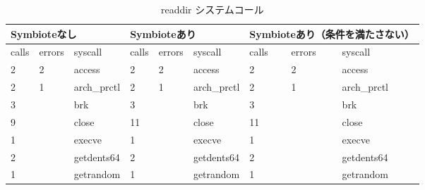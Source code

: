 \documentclass[submit,techreq,noauthor]{eco}	%
\begin{document}
\begin{table*}[t]
  \centering
  \caption{readdir システムコール}
  \label{table: readdir}
  \begin{tabular}{|lll|lll|lll|}
  \hline
  \multicolumn{3}{|l|}{Symbioteなし}                                              & \multicolumn{3}{l|}{Symbioteあり}                                              & \multicolumn{3}{l|}{Symbioteあり（条件を満たさない）}                                    \\ \hline
  \multicolumn{1}{|l|}{calls} & \multicolumn{1}{l|}{errors} & syscall           & \multicolumn{1}{l|}{calls} & \multicolumn{1}{l|}{errors} & syscall           & \multicolumn{1}{l|}{calls} & \multicolumn{1}{l|}{errors} & syscall           \\ \hline
  \multicolumn{1}{|l|}{2}     & \multicolumn{1}{l|}{2}      & access            & \multicolumn{1}{l|}{2}     & \multicolumn{1}{l|}{2}      & access            & \multicolumn{1}{l|}{2}     & \multicolumn{1}{l|}{2}      & access            \\
  \multicolumn{1}{|l|}{2}     & \multicolumn{1}{l|}{1}      & arch\_prctl       & \multicolumn{1}{l|}{2}     & \multicolumn{1}{l|}{1}      & arch\_prctl       & \multicolumn{1}{l|}{2}     & \multicolumn{1}{l|}{1}      & arch\_prctl       \\
  \multicolumn{1}{|l|}{3}     & \multicolumn{1}{l|}{}       & brk               & \multicolumn{1}{l|}{3}     & \multicolumn{1}{l|}{}       & brk               & \multicolumn{1}{l|}{3}     & \multicolumn{1}{l|}{}       & brk               \\
  \multicolumn{1}{|l|}{9}     & \multicolumn{1}{l|}{}       & close             & \multicolumn{1}{l|}{11}    & \multicolumn{1}{l|}{}       & close             & \multicolumn{1}{l|}{11}    & \multicolumn{1}{l|}{}       & close             \\
  \multicolumn{1}{|l|}{1}     & \multicolumn{1}{l|}{}       & execve            & \multicolumn{1}{l|}{1}     & \multicolumn{1}{l|}{}       & execve            & \multicolumn{1}{l|}{1}     & \multicolumn{1}{l|}{}       & execve            \\
  \multicolumn{1}{|l|}{2}     & \multicolumn{1}{l|}{}       & getdents64        & \multicolumn{1}{l|}{2}     & \multicolumn{1}{l|}{}       & getdents64        & \multicolumn{1}{l|}{2}     & \multicolumn{1}{l|}{}       & getdents64        \\
  \multicolumn{1}{|l|}{1}     & \multicolumn{1}{l|}{}       & getrandom         & \multicolumn{1}{l|}{1}     & \multicolumn{1}{l|}{}       & getrandom         & \multicolumn{1}{l|}{1}     & \multicolumn{1}{l|}{}       & getrandom         \\

\end{tabular}
\end{table*}
\end{document}
